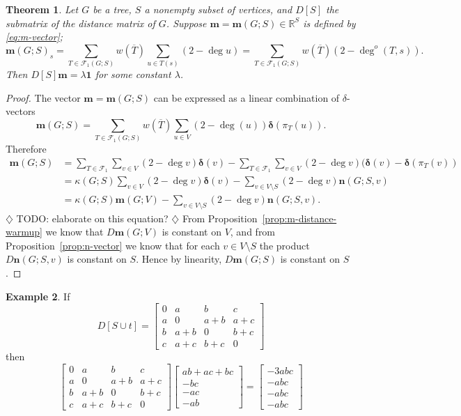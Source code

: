 \documentclass{amsart}
\newtheorem{thm}{Theorem}[section]
\theoremstyle{definition}
\newtheorem{eg}[thm]{Example}
\newcommand{\RR}{\mathbb{R}}
\newcommand{\bone}{\mathbf{1}}
\newcommand{\bolddelta}{\bm{\delta}}
\newcommand{\boldm}{\mathbf{m}}
\newcommand{\boldn}{\mathbf{n}}
\newcommand{\trees}{\mathcal{F}_1}
\newcommand{\degout}{\deg^o}
\newcommand{\note}[1]{{\color{red} \sf $\diamondsuit$  {#1} $\diamondsuit$ }}
\begin{document}
\begin{thm}
Let $G$ be a tree, $S$ a nonempty subset of vertices,
and $D[S]$ the submatrix of the distance matrix of $G$.
Suppose $\boldm = \boldm(G;S) \in \RR^{S}$ is defined by \eqref{eq:m-vector};
\begin{equation}
	\boldm(G;S)_s = \sum_{T \in \trees(G;S)} w(\overline{T}) \sum_{u \in T(s)} (2 - \deg u) 
	= \sum_{T \in \trees(G;S)} w(\overline{T}) (2 - \degout(T,s)) .
\end{equation}
Then $D[S] \boldm = \lambda \bone$
for some constant $\lambda$.
\end{thm}
\begin{proof}
The vector $\boldm = \boldm(G;S)$ can be expressed as a linear combination of $\delta$-vectors
\[
	\boldm(G; S) = \sum_{T \in \trees(G; S)} w(\overline{T}) \sum_{u \in V} (2 - \deg(u)) \bolddelta(\pi_T(u)).
\]
Therefore
\begin{align}
	\boldm (G;S)
	&= \sum_{T \in \trees} \sum_{v \in V}(2 - \deg v) {\bolddelta}(v) 
	- \sum_{T \in \trees} \sum_{v \in V} (2 - \deg v) (\bolddelta(v) - \bolddelta(\pi_T(v)) \\
	&= \kappa(G; S) \sum_{v \in V}(2 - \deg v) {\bolddelta}(v) 
	- \sum_{v \in V \setminus S} (2 - \deg v) \mathbf{n}(G;S,v) \\
	&= \kappa(G;S) \boldm(G;V) - \sum_{v\in V\setminus S} (2 - \deg v) \boldn(G;S,v).
\end{align}
\note{TODO: elaborate on this equation?}
From Proposition~\ref{prop:m-distance-warmup} we know that $D \boldm(G;V)$ is constant on $V$,
and from Proposition~\ref{prop:n-vector} we know that  for each $v \in V \setminus S$ the product $D \boldn(G;S,v)$ is constant on $S$.
Hence by linearity, $D \boldm(G;S)$ is constant on $S$.
\end{proof}

\begin{eg}
If 
$$
D[S \cup t] = \begin{bmatrix}
0 & a & b & c \\
a & 0 & a + b & a + c \\
b & a + b & 0 & b + c \\
c & a + c & b + c & 0
\end{bmatrix}
$$
then
$$
 \begin{bmatrix}
0 & a & b & c \\
a & 0 & a + b & a + c \\
b & a + b & 0 & b + c \\
c & a + c & b + c & 0
\end{bmatrix}
\begin{bmatrix}
ab + ac + bc \\ -bc \\ -ac \\ -ab 
\end{bmatrix}
= \begin{bmatrix}
-3abc \\ -abc \\ -abc \\ -abc
\end{bmatrix}
$$
\end{eg}
\end{document}
